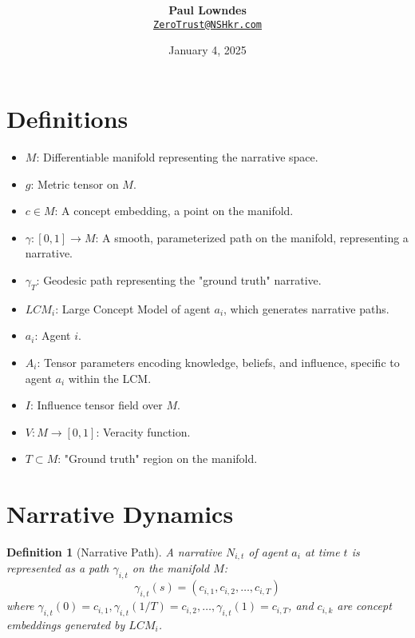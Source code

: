 \documentclass[12pt, a4paper]{article}
\title{\vspace{-2cm}\textbf{}}
\author{\textbf{Paul Lowndes} \\ \href{mailto:ZeroTrust@NSHkr.com}{\texttt{ZeroTrust@NSHkr.com}}}
\date{\small January 4, 2025}
\newtheorem{definition}{Definition}
\begin{document}
\maketitle
\vspace{-1.5em}

\begin{abstract}

\end{abstract}


\section{Definitions}

\begin{itemize}
    \item \( M \): Differentiable manifold representing the narrative space.
    \item \( g \): Metric tensor on \( M \).
    \item \( c \in M \): A concept embedding, a point on the manifold.
    \item \( \gamma: [0,1] \rightarrow M \): A smooth, parameterized path on the manifold, representing a narrative.
    \item \( \gamma_T \): Geodesic path representing the "ground truth" narrative.
    \item \( LCM_i \): Large Concept Model of agent \( a_i \), which generates narrative paths.
	\item \( a_i \): Agent \( i \).
    \item \( A_i \): Tensor parameters encoding knowledge, beliefs, and influence, specific to agent \( a_i \) within the LCM.
	\item \( I \): Influence tensor field over \( M \).
    \item \( V: M \rightarrow [0, 1] \): Veracity function.
    \item \( T \subset M \): "Ground truth" region on the manifold.
	
\end{itemize}

\section{Narrative Dynamics}

\begin{definition}[Narrative Path]
A narrative \( N_{i,t} \) of agent \( a_i \) at time \( t \) is represented as a path \( \gamma_{i,t} \) on the manifold \( M \):
\begin{equation}
    \gamma_{i,t}(s) = (c_{i,1}, c_{i,2}, \dots, c_{i,T})
\end{equation}
where \( \gamma_{i,t}(0) = c_{i,1}, \gamma_{i,t}(1/T) = c_{i,2}, \dots, \gamma_{i,t}(1) = c_{i,T} \), and \( c_{i,k} \) are concept embeddings generated by \( LCM_i \).
\end{definition}
\end{document}
